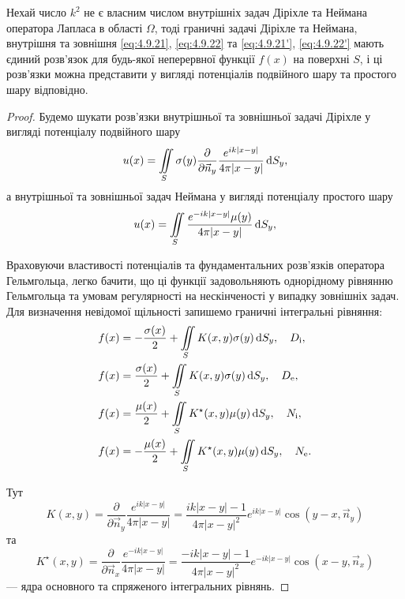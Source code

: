 \begin{theorem}
	Нехай число $k^2$ не є власним числом внутрішніх задач Діріхле та Неймана оператора Лапласа в області $\Omega$, тоді граничні задачі Діріхле та Неймана, внутрішня та зовнішня \eqref{eq:4.9.21}, \eqref{eq:4.9.22} та \eqref{eq:4.9.21'}, \eqref{eq:4.9.22'} мають єдиний розв'язок для будь-якої неперервної функції $f(x)$ на поверхні $S$, і ці розв'язки можна представити у вигляді потенціалів подвійного шару та простого шару відповідно.
\end{theorem}

\begin{proof}
	Будемо шукати розв'язки внутрішньої та зовнішньої задачі Діріхле у вигляді потенціалу подвійного шару
	\begin{equation}
		\label{eq:4.9.23}
		u(x) = \displaystyle\iint\limits_S \sigma(y) \frac{\partial}{\partial \vec n_y} \frac{e^{i k |x - y|}}{4 \pi |x - y|} \mathop{}\!\mathrm{d} S_y,
	\end{equation}
	а внутрішньої та зовнішньої задач Неймана у вигляді потенціалу простого шару
	\begin{equation}
		\label{eq:4.9.24}
	u(x)=	\displaystyle\iint\limits_S \frac{e^{- i k |x - y|} \mu(y)}{4 \pi |x - y|} \mathop{}\!\mathrm{d} S_y,
	\end{equation}

	Враховуючи властивості потенціалів та фундаментальних розв'язків оператора Гельмгольца, легко бачити, що ці функції задовольняють однорідному рівнянню Гельмгольца та умовам регулярності на нескінченості у випадку зовнішніх задач.
	Для визначення невідомої щільності запишемо граничні інтегральні рівняння:
	\begin{align}
		\label{eq:4.9.25}
		& f(x) = - \frac{\sigma(x)}{2} + \displaystyle\iint\limits_S K(x, y) \sigma(y) \mathop{}\!\mathrm{d} S_y, \quad D_{\text{i}}, \\
		\label{eq:4.9.25'}
		& f(x) = \frac{\sigma(x)}{2} + \displaystyle\iint\limits_S K(x, y) \sigma(y) \mathop{}\!\mathrm{d} S_y, \quad D_{\text{e}}, \\
		\label{eq:4.9.26}
		& f(x) = \frac{\mu(x)}{2} + \displaystyle\iint\limits_S K^\star(x, y) \mu(y) \mathop{}\!\mathrm{d} S_y, \quad N_{\text{i}}, \\
		\label{eq:4.9.26'}
		& f(x) = - \frac{\mu(x)}{2} + \displaystyle\iint\limits_S K^\star(x, y) \mu(y) \mathop{}\!\mathrm{d} S_y, \quad N_{\text{e}}.
	\end{align}

	Тут
	\begin{equation}
		\label{eq:4.9.27}
		K(x, y) = \frac{\partial}{\partial \vec n_y} \frac{e^{ik|x - y|}}{4 \pi |x - y|} = \frac{i k |x - y| - 1}{4 \pi |x - y|^2} e^{i k|x - y|} \cos(y - x, \vec n_y)
	\end{equation}
	та
	\begin{equation}
		\label{eq:4.9.27'}
		K^\star(x, y) = \frac{\partial}{\partial \vec n_x} \frac{e^{-ik|x - y|}}{4 \pi |x - y|} = \frac{- i k |x - y| - 1}{4 \pi |x - y|^2} e^{- i k|x - y|} \cos(x - y, \vec n_x)
	\end{equation}
	--- ядра основного та спряженого інтегральних рівнянь. \medskip


\end{proof}
